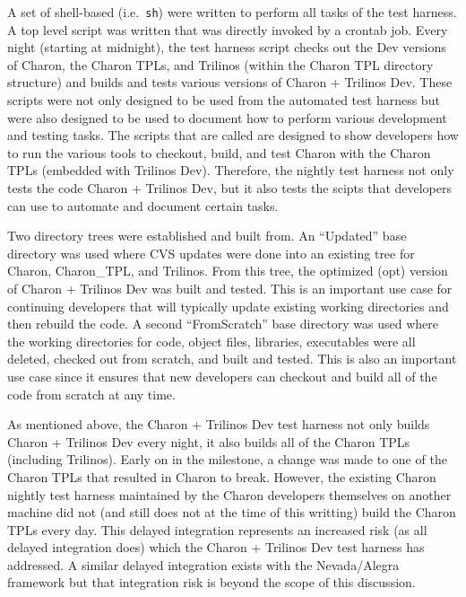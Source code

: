 \documentclass[pdf,ps2pdf,11pt]{SANDreport}
\begin{document}
A set of shell-based (i.e.\ {}\texttt{sh}) were written to perform all tasks
of the test harness.  A top level script was written that was directly invoked
by a crontab job.  Every night (starting at midnight), the test harness script
checks out the Dev versions of Charon, the Charon TPLs, and Trilinos (within
the Charon TPL directory structure) and builds and tests various versions of
Charon + Trilinos Dev.  These scripts were not only designed to be used from
the automated test harness but were also designed to be used to document how
to perform various development and testing tasks.  The scripts that are called
are designed to show developers how to run the various tools to checkout,
build, and test Charon with the Charon TPLs (embedded with Trilinos Dev).
Therefore, the nightly test harness not only tests the code Charon + Trilinos
Dev, but it also tests the scipts that developers can use to automate and
document certain tasks.

Two directory trees were established and built from.  An ``Updated'' base
directory was used where CVS updates were done into an existing tree for
Charon, Charon\_TPL, and Trilinos.  From this tree, the optimized (opt) version
of Charon + Trilinos Dev was built and tested.  This is an important use case
for continuing developers that will typically update existing working
directories and then rebuild the code.  A second ``FromScratch'' base
directory was used where the working directories for code, object files,
libraries, executables were all deleted, checked out from scratch, and built
and tested.  This is also an important use case since it ensures that new
developers can checkout and build all of the code from scratch at any time.

As mentioned above, the Charon + Trilinos Dev test harness not only builds
Charon + Trilinos Dev every night, it also builds all of the Charon TPLs
(including Trilinos).  Early on in the milestone, a change was made to one of
the Charon TPLs that resulted in Charon to break.  However, the existing
Charon nightly test harness maintained by the Charon developers themselves on
another machine did not (and still does not at the time of this writting)
build the Charon TPLs every day.  This delayed integration represents an
increased risk (as all delayed integration does) which the Charon + Trilinos
Dev test harness has addressed.  A similar delayed integration exists with the
Nevada/Alegra framework but that integration risk is beyond the scope of this
discussion.
\end{document}
